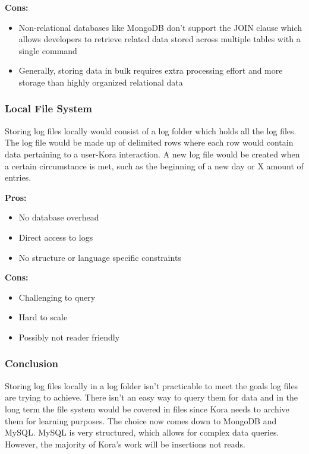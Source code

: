 \documentclass[onecolumn, draftclsnofoot,10pt, compsoc]{IEEEtran}
\begin{document}
	\textbf{Cons:}
	\begin{itemize}
		\item{
			Non-relational databases like MongoDB don't support the JOIN clause which allows developers to retrieve related data stored across multiple tables with a single command}
		\item{
			Generally, storing data in bulk requires extra processing effort and more storage than highly organized relational data \cite{SQLvsNoSQLupwork}}
	\end{itemize}


	\subsubsection{Local File System}
	Storing log files locally would consist of a log folder which holds all the log files.
	The log file would be made up of delimited rows where each row would contain data pertaining to a user-Kora interaction.
	A new log file would be created when a certain circumstance is met, such as the beginning of a new day or X amount of entries.

	\textbf{Pros:}
	\begin{itemize}
		\item{
			No database overhead}
		\item{
			Direct access to logs}
		\item{
			No structure or language specific constraints}
	\end{itemize}
	\textbf{Cons:}
	\begin{itemize}
		\item{
			Challenging to query}
		\item{
			Hard to scale}
		\item{
			Possibly not reader friendly}
	\end{itemize}
	\subsubsection{Conclusion}
	Storing log files locally in a log folder isn't practicable to meet the goals log files are trying to achieve.
	There isn't an easy way to query them for data and in the long term the file system would be covered in files since Kora needs to archive them for learning purposes.
	The choice now comes down to MongoDB and MySQL.
	MySQL is very structured, which allows for complex data queries.
	However, the majority of Kora's work will be insertions not reads.
\end{document}
